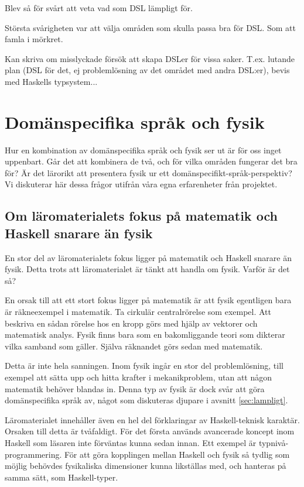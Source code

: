 \begin{binge}
Blev så för svårt att veta vad som DSL lämpligt för.

Största svårigheten var att välja områden som skulla passa bra för DSL. Som att
famla i mörkret.

Kan skriva om misslyckade försök att skapa DSLer för vissa saker. T.ex. lutande plan (DSL för det, ej problemlösning av det området med andra DSL:er), bevis med Haskells typsystem...

\section{Domänspecifika språk och fysik}

Hur en kombination av domänspecifika språk och fysik ser ut är för oss inget uppenbart. Går det att kombinera de två, och för vilka områden fungerar det bra för? Är det lärorikt att presentera fysik ur ett domänspecifikt-språk-perspektiv? Vi diskuterar här dessa frågor utifrån våra egna erfarenheter från projektet. 

\subsection{Om läromaterialets fokus på matematik och Haskell snarare än fysik}

En stor del av läromaterialets fokus ligger på matematik och Haskell snarare än
fysik. Detta trots att läromaterialet är tänkt att handla om fysik. Varför är
det så?

En orsak till att ett stort fokus ligger på matematik är att fysik egentligen
bara är räkneexempel i matematik. Ta cirkulär centralrörelse som exempel. Att
beskriva en sådan rörelse hos en kropp görs med hjälp av vektorer och
matematisk analys. Fysik finns bara som en bakomliggande teori som dikterar
vilka samband som gäller. Själva räknandet görs sedan med matematik.

Detta är inte hela sanningen. Inom fysik ingår en stor del problemlösning, till
exempel att sätta upp och hitta krafter i mekanikproblem, utan att någon
matematik behöver blandas in. Denna typ av fysik är dock svår att göra
domänspecifika språk av, något som diskuteras djupare i avsnitt
\ref{sec:lampligt}.

Läromaterialet innehåller även en hel del förklaringar av Haskell-teknisk
karaktär. Orsaken till detta är tvåfaldigt. För det första
används avancerade koncept inom Haskell som läsaren inte förväntas kunna sedan
innan. Ett exempel är typnivå-programmering. För att göra kopplingen mellan
Haskell och fysik så tydlig som möjlig behövdes fysikaliska dimensioner kunna
likställas med, och hanteras på samma sätt, som Haskell-typer.


\end{binge}
